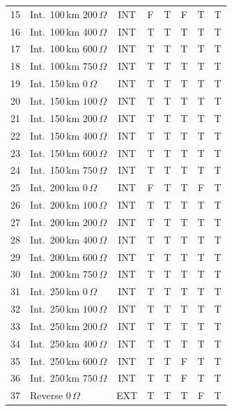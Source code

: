 \documentclass[journal]{IEEEtran}
\newcommand{\TT}{T}
\newcommand{\FF}{F}
\begin{document}
\begin{table}[!t]
\begin{tabular}{@{}clcccccc@{}}
15 & Int.\ 100\,km $200\,\Omega$ & INT & \FF & \TT & \FF & \TT & \TT \\
16 & Int.\ 100\,km $400\,\Omega$ & INT & \TT & \TT & \TT & \TT & \TT \\
17 & Int.\ 100\,km $600\,\Omega$ & INT & \TT & \TT & \TT & \TT & \TT \\
18 & Int.\ 100\,km $750\,\Omega$ & INT & \TT & \TT & \TT & \TT & \TT \\
\midrule
19 & Int.\ 150\,km $0\,\Omega$   & INT & \TT & \TT & \TT & \TT & \TT \\
20 & Int.\ 150\,km $100\,\Omega$ & INT & \TT & \TT & \TT & \TT & \TT \\
21 & Int.\ 150\,km $200\,\Omega$ & INT & \TT & \TT & \TT & \TT & \TT \\
22 & Int.\ 150\,km $400\,\Omega$ & INT & \TT & \TT & \TT & \TT & \TT \\
23 & Int.\ 150\,km $600\,\Omega$ & INT & \TT & \TT & \TT & \TT & \TT \\
24 & Int.\ 150\,km $750\,\Omega$ & INT & \TT & \TT & \TT & \TT & \TT \\
\midrule
25 & Int.\ 200\,km $0\,\Omega$   & INT & \FF & \TT & \TT & \FF & \TT \\
26 & Int.\ 200\,km $100\,\Omega$ & INT & \TT & \TT & \TT & \TT & \TT \\
27 & Int.\ 200\,km $200\,\Omega$ & INT & \TT & \TT & \TT & \TT & \TT \\
28 & Int.\ 200\,km $400\,\Omega$ & INT & \TT & \TT & \TT & \TT & \TT \\
29 & Int.\ 200\,km $600\,\Omega$ & INT & \TT & \TT & \TT & \TT & \TT \\
30 & Int.\ 200\,km $750\,\Omega$ & INT & \TT & \TT & \TT & \TT & \TT \\
\midrule
31 & Int.\ 250\,km $0\,\Omega$   & INT & \TT & \TT & \TT & \TT & \TT \\
32 & Int.\ 250\,km $100\,\Omega$ & INT & \TT & \TT & \TT & \TT & \TT \\
33 & Int.\ 250\,km $200\,\Omega$ & INT & \TT & \TT & \TT & \TT & \TT \\
34 & Int.\ 250\,km $400\,\Omega$ & INT & \TT & \TT & \TT & \TT & \TT \\
35 & Int.\ 250\,km $600\,\Omega$ & INT & \TT & \TT & \FF & \TT & \TT \\
36 & Int.\ 250\,km $750\,\Omega$ & INT & \TT & \TT & \FF & \TT & \TT \\
\midrule
37 & Reverse $0\,\Omega$    & EXT & \TT & \TT & \TT & \FF & \TT \\

\end{tabular}
\end{table}
\end{document}
